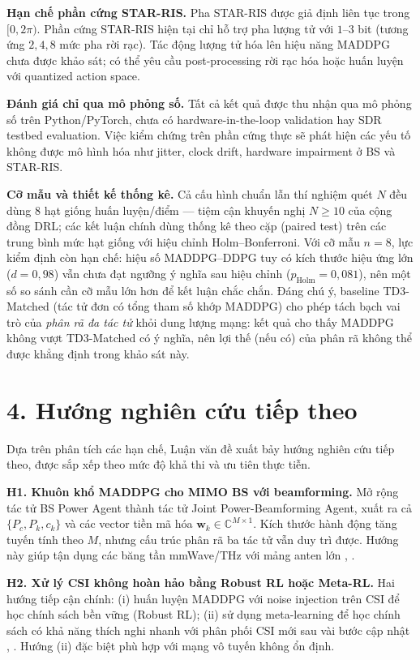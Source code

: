 \textbf{Hạn chế phần cứng STAR-RIS.} Pha STAR-RIS được giả định liên
tục trong $[0, 2\pi)$. Phần cứng STAR-RIS hiện tại chỉ hỗ trợ pha
lượng tử với $1$--$3$ bit (tương ứng $2, 4, 8$ mức pha rời rạc). Tác
động lượng tử hóa lên hiệu năng MADDPG chưa được khảo sát; có thể yêu
cầu post-processing rời rạc hóa hoặc huấn luyện với quantized action
space.

\textbf{Đánh giá chỉ qua mô phỏng số.} Tất cả kết quả được thu nhận
qua mô phỏng số trên Python/PyTorch, chưa có hardware-in-the-loop
validation hay SDR testbed evaluation. Việc kiểm chứng trên phần cứng
thực sẽ phát hiện các yếu tố không được mô hình hóa như jitter,
clock drift, hardware impairment ở BS và STAR-RIS.

\textbf{Cỡ mẫu và thiết kế thống kê.} Cả cấu hình chuẩn lẫn thí nghiệm
quét $N$ đều dùng $8$ hạt giống huấn luyện/điểm --- tiệm cận khuyến
nghị $N \geq 10$ của cộng đồng DRL; các kết luận chính dùng thống kê
theo cặp (paired test) trên các trung bình mức hạt giống với hiệu
chỉnh Holm--Bonferroni. Với cỡ mẫu $n=8$, lực kiểm định còn hạn chế:
hiệu số MADDPG--DDPG tuy có kích thước hiệu ứng lớn ($d=0{,}98$) vẫn
chưa đạt ngưỡng ý nghĩa sau hiệu chỉnh ($p_{\text{Holm}}=0{,}081$), nên
một số so sánh cần cỡ mẫu lớn hơn để kết luận chắc chắn. Đáng chú ý,
baseline TD3-Matched (tác tử đơn có tổng tham số khớp MADDPG) cho phép
tách bạch vai trò của \emph{phân rã đa tác tử} khỏi dung lượng mạng:
kết quả cho thấy MADDPG không vượt TD3-Matched có ý nghĩa, nên lợi thế
(nếu có) của phân rã không thể được khẳng định trong khảo sát này.

\section*{4. Hướng nghiên cứu tiếp theo}

Dựa trên phân tích các hạn chế, Luận văn đề xuất bảy hướng nghiên cứu
tiếp theo, được sắp xếp theo mức độ khả thi và ưu tiên thực tiễn.

\textbf{H1. Khuôn khổ MADDPG cho MIMO BS với beamforming.} Mở rộng tác
tử BS Power Agent thành tác tử Joint Power-Beamforming Agent, xuất ra
cả $\{P_c, P_k, c_k\}$ và các vector tiền mã hóa $\mathbf{w}_k \in
\mathbb{C}^{M \times 1}$. Kích thước hành động tăng tuyến tính theo
$M$, nhưng cấu trúc phân rã ba tác tử vẫn duy trì được. Hướng này
giúp tận dụng các băng tần mmWave/THz với mảng anten lớn
\cite{wu2024deep}, \cite{wang2024rsbnn}.

\textbf{H2. Xử lý CSI không hoàn hảo bằng Robust RL hoặc Meta-RL.}
Hai hướng tiếp cận chính: (i) huấn luyện MADDPG với noise injection
trên CSI để học chính sách bền vững (Robust RL); (ii) sử dụng
meta-learning để học chính sách có khả năng thích nghi nhanh với phân
phối CSI mới sau vài bước cập nhật \cite{faramarzi2024meta},
\cite{cernaloli2023meta}. Hướng (ii) đặc biệt phù hợp với mạng vô
tuyến không ổn định.

